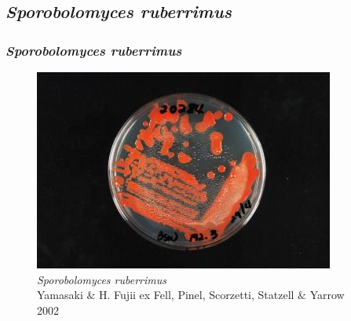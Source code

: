 \documentclass{beamer}
\begin{document}
\subsection{\textit{Sporobolomyces ruberrimus}}
\begin{frame}
    \frametitle{\textit{Sporobolomyces ruberrimus}}
    \begin{figure}
        \centering
        \includegraphics[scale=0.8]{sporobolo.jpg}\\
        \scriptsize{\textit{Sporobolomyces ruberrimus}\\
         Yamasaki $\&$ H. Fujii ex Fell, Pinel, Scorzetti, Statzell $\&$ Yarrow 2002}
    \end{figure}
\end{frame}
\end{document}
